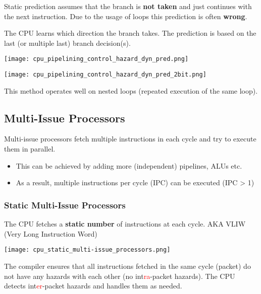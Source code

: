 \begin{multicols*}{2}
    Static prediction assumes that the branch is \textbf{not taken} and just continues with the next instruction. Due to the usage of loops this prediction is often \textbf{wrong}.

    \newpar{}

    The CPU learns which direction the branch takes. The prediction is based on the last (or multiple last) branch decision(s). %
    \begin{center}
        \texttt{[image: cpu\_pipelining\_control\_hazard\_dyn\_pred.png]}
    \end{center}

    \newpar{}
    \begin{center}
        \texttt{[image: cpu\_pipelining\_control\_hazard\_dyn\_pred\_2bit.png]}
    \end{center}

    This method operates well on nested loops (repeated execution of the same loop).

    \subsection{Multi-Issue Processors}\label{multi-issue processors}
    Multi-issue processors fetch multiple instructions in each cycle and try to execute them in parallel.
    \begin{itemize}
        \item This can be achieved by adding more (independent) pipelines, ALUs etc.
        \item As a result, multiple instructions per cycle (IPC) can be executed (IPC > 1)
    \end{itemize}
    \subsubsection{Static Multi-Issue Processors}
    The CPU fetches a \textbf{static number} of instructions at each cycle. AKA VLIW (Very Long Instruction Word)

    \texttt{[image: cpu\_static\_multi-issue\_processors.png]}

    The compiler ensures that all instructions fetched in the same cycle (packet) do not have any hazards with each other (no int\textcolor{red}{ra}-packet hazards). The CPU detects int\textcolor{red}{er}-packet hazards and handles them as needed.


\end{multicols*}
